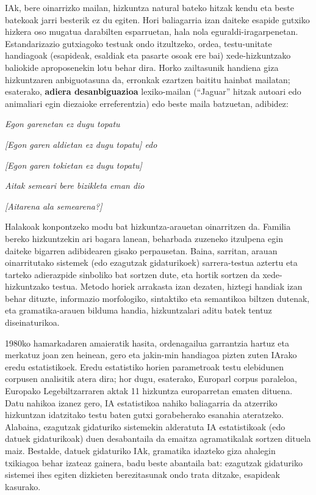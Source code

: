 \begin{multicols}{2}
IAk, bere oinarrizko mailan, hizkuntza natural bateko hitzak kendu eta beste batekoak jarri besterik ez du egiten. Hori baliagarria izan daiteke esapide gutxiko hizkera oso mugatua darabilten esparruetan, hala nola eguraldi-iragarpenetan. Estandarizazio gutxiagoko testuak ondo itzultzeko, ordea, testu-unitate handiagoak (esapideak, esaldiak eta pasarte osoak ere bai) xede-hizkuntzako baliokide aproposenekin lotu behar dira. Horko zailtasunik handiena giza hizkuntzaren anbiguotasuna da, erronkak ezartzen baititu hainbat mailatan; esaterako, \textbf{adiera desanbiguazioa} lexiko-mailan (“Jaguar” hitzak autoari edo animaliari egin diezaioke erreferentzia) edo beste maila batzuetan, adibidez:

\textit{Egon garenetan ez dugu topatu}

\textit{[Egon garen aldietan ez dugu topatu] edo} 

\textit{[Egon garen tokietan ez dugu topatu]}

\textit{Aitak semeari bere bizikleta eman dio}

\textit{[Aitarena ala semearena?]}

Halakoak konpontzeko modu bat hizkuntza-arauetan oinarritzen da. Familia bereko hizkuntzekin ari bagara lanean, beharbada zuzeneko itzulpena egin daiteke bigarren adibidearen gisako perpausetan. Baina, sarritan, arauan oinarritutako sistemek (edo ezagutzak gidaturikoek) sarrera-testua aztertu eta tarteko adierazpide sinboliko bat sortzen dute, eta hortik sortzen da xede-hizkuntzako testua. Metodo horiek arrakasta izan dezaten, hiztegi handiak izan behar dituzte, informazio morfologiko, sintaktiko eta semantikoa biltzen dutenak, eta gramatika-arauen bilduma handia, hizkuntzalari aditu batek tentuz diseinaturikoa.

1980ko hamarkadaren amaieratik hasita, ordenagailua garrantzia hartuz eta merkatuz joan zen heinean, gero eta jakin-min handiagoa pizten zuten IArako eredu estatistikoek. Eredu estatistiko horien parametroak testu elebidunen corpusen analisitik atera dira; hor dugu, esaterako, Europarl corpus paraleloa, Europako Legebiltzarraren aktak 11 hizkuntza europarretan ematen dituena. Datu nahikoa izanez gero, IA estatistikoa nahiko baliagarria da atzerriko hizkuntzan idatzitako testu baten gutxi gorabeherako esanahia ateratzeko. Alabaina, ezagutzak gidaturiko sistemekin alderatuta IA estatistikoak (edo datuek gidaturikoak) duen desabantaila da emaitza agramatikalak sortzen dituela maiz. Bestalde, datuek gidaturiko IAk, gramatika idazteko giza ahalegin txikiagoa behar izateaz gainera, badu beste abantaila bat: ezagutzak gidaturiko sistemei ihes egiten dizkieten berezitasunak ondo trata ditzake, esapideak kasurako. 


\end{multicols}
